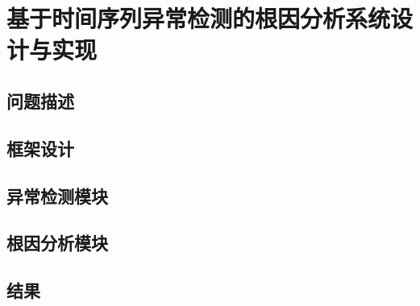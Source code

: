 
\chapter{基于时间序列异常检测的根因分析系统设计与实现}
\label{cha:intro}
\section{问题描述}
\section{框架设计}
\section{异常检测模块}
\section{根因分析模块}
\section{结果}

